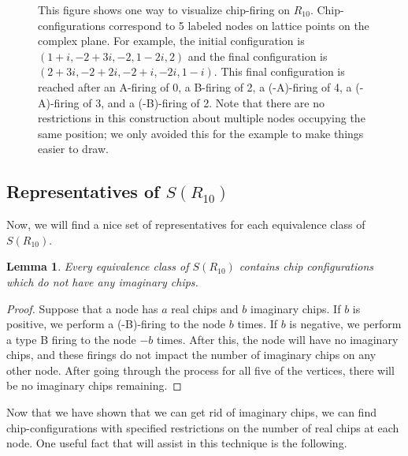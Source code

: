 \documentclass[12p]{amsart}
\numberwithin{equation}{section}
\theoremstyle{plain}
\newtheorem{lemma}[thm]{Lemma}
\theoremstyle{definition}
\begin{document}
\begin{figure}
\begin{center}
    \caption{This figure shows one way to visualize chip-firing on $R_{10}$. Chip-configurations correspond to 5 labeled nodes on lattice points on the complex plane. For example, the initial configuration is $(1+i, -2 + 3i, -2, 1-2i, 2)$ and the final configuration is $(2+3i, -2 + 2i, -2 + i,-2i, 1-i)$. This final configuration is reached after an A-firing of 0, a B-firing of 2, a (-A)-firing of 4, a (-A)-firing of 3, and a (-B)-firing of 2. Note that there are no restrictions in this construction about multiple nodes occupying the same position; we only avoided this for the example to make things easier to draw.}
    \label{fig:geometric}
\end{center}
\end{figure}

\subsection{Representatives of $S(R_{10})$}
Now, we will find a nice set of representatives for each equivalence class of $S(R_{10})$. 

\begin{lemma}\label{lem:no_i}
    Every equivalence class of $S(R_{10})$ contains chip configurations which do not have any imaginary chips. 
\end{lemma}
\begin{proof}
    Suppose that a node has $a$ real chips and $b$ imaginary chips. If $b$ is positive, we perform a (-B)-firing to the node $b$ times. If $b$ is negative, we perform a type B firing to the node $-b$ times. After this, the node will have no imaginary chips, and these firings do not impact the number of imaginary chips on any other node. After going through the process for all five of the vertices, there will be no imaginary chips remaining. 
\end{proof}

Now that we have shown that we can get rid of imaginary chips, we can find chip-configurations with specified restrictions on the number of real chips at each node. One useful fact that will assist in this technique is the following. 
\end{document}
